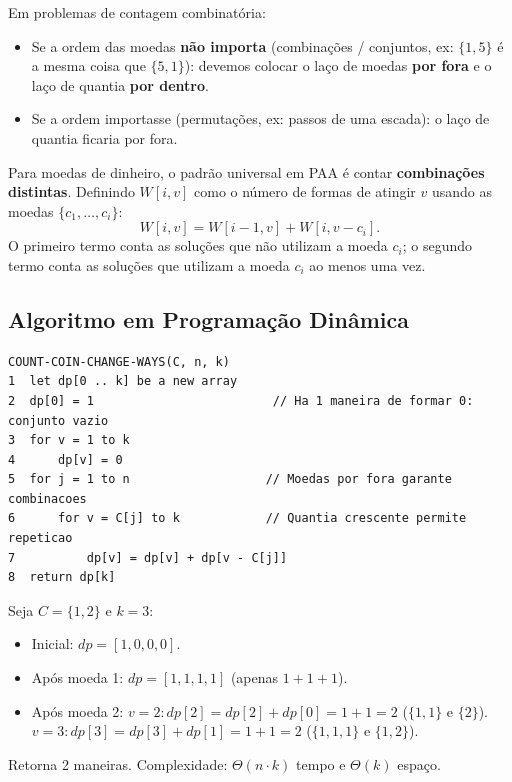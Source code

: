 \documentclass[11pt,a4paper]{article}
\begin{document}
\begin{teoria}
Em problemas de contagem combinatória:
\begin{itemize}
    \item Se a ordem das moedas \textbf{não importa} (combinações / conjuntos, ex: $\{1, 5\}$ é a mesma coisa que $\{5, 1\}$): devemos colocar o laço de moedas \textbf{por fora} e o laço de quantia \textbf{por dentro}.
    \item Se a ordem importasse (permutações, ex: passos de uma escada): o laço de quantia ficaria por fora.
\end{itemize}
Para moedas de dinheiro, o padrão universal em PAA é contar \textbf{combinações distintas}.
Definindo $W[i, v]$ como o número de formas de atingir $v$ usando as moedas $\{c_1, \dots, c_i\}$:
\[
W[i, v] = W[i-1, v] + W[i, v - c_i].
\]
O primeiro termo conta as soluções que não utilizam a moeda $c_i$; o segundo termo conta as soluções que utilizam a moeda $c_i$ ao menos uma vez.
\end{teoria}

\subsection*{Algoritmo em Programação Dinâmica}

\begin{lstlisting}[caption={Algoritmo para Contar Maneiras Distintas de Formar o Troco}]
COUNT-COIN-CHANGE-WAYS(C, n, k)
1  let dp[0 .. k] be a new array
2  dp[0] = 1                         // Ha 1 maneira de formar 0: conjunto vazio
3  for v = 1 to k
4      dp[v] = 0
5  for j = 1 to n                   // Moedas por fora garante combinacoes
6      for v = C[j] to k            // Quantia crescente permite repeticao
7          dp[v] = dp[v] + dp[v - C[j]]
8  return dp[k]
\end{lstlisting}

\begin{dica}
Seja $C = \{1, 2\}$ e $k = 3$:
\begin{itemize}
    \item Inicial: $dp = [1, 0, 0, 0]$.
    \item Após moeda 1: $dp = [1, 1, 1, 1]$ (apenas $1+1+1$).
    \item Após moeda 2:
    $v=2: dp[2] = dp[2] + dp[0] = 1 + 1 = 2$ ($\{1, 1\}$ e $\{2\}$).
    $v=3: dp[3] = dp[3] + dp[1] = 1 + 1 = 2$ ($\{1, 1, 1\}$ e $\{1, 2\}$).
\end{itemize}
Retorna 2 maneiras. Complexidade: $\Theta(n \cdot k)$ tempo e $\Theta(k)$ espaço.
\end{dica}
\end{document}
